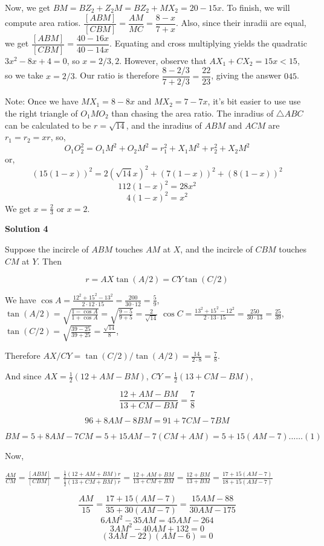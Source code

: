 \begin{enumerate}
 Now, we get $BM=BZ_{2}+Z_{2}M=BZ_{2}+MX_{2}=20-15x$. To finish, we will compute area ratios. $\dfrac{[ABM]}{[CBM]}=\dfrac{AM}{MC}=\dfrac{8-x}{7+x}$. Also, since their inradii are equal, we get $\dfrac{[ABM]}{[CBM]}=\dfrac{40-16x}{40-14x}$. Equating and cross multiplying yields the quadratic $3x^{2}-8x+4=0$, so $x=2/3,2$. However, observe that $AX_{1}+CX_{2}=15x<15$, so we take $x=2/3$. Our ratio is therefore $\dfrac{8-2/3}{7+2/3}=\dfrac{22}{23}$, giving the answer $\boxed{045}$.

 Note: Once we have $MX_1=8-8x$ and $MX_2=7-7x$, it's bit easier to use use the right triangle of $O_1MO_2$ than chasing the area ratio. The inradius of $\triangle{ABC}$ can be calculated to be $r=\sqrt{14}$, and the inradius of $ABM$ and $ACM$ are $r_1=r_2= xr$, so, 
 \[O_1O_2^2 = O_1M^2 + O_2M^2 = r_1^2+X_1M^2 + r_2^2 + X_2M^2\]or,
 \[(15(1-x))^2 = 2(\sqrt{14}x)^2 + (7(1-x))^2 + (8(1-x))^2\]
 \[112(1-x)^2 = 28x^2\]
 \[4(1-x)^2 = x^2\]We get $x=\frac{2}{3}$ or $x=2$.

 



\textbf{Solution 4}

Suppose the incircle of $ABM$ touches $AM$ at $X$, and the incircle of $CBM$ touches $CM$ at $Y$. Then

 
 \[r = AX \tan(A/2) = CY \tan(C/2)\]

 We have $\cos A = \frac{12^2+15^2-13^2}{2\cdot 12\cdot 15} = \frac{200}{30\cdot 12}=\frac{5}{9}$, $\tan(A/2) = \sqrt{\frac{1-\cos A}{1+\cos A}} = \sqrt{\frac{9-5}{9+5}} = \frac{2}{\sqrt{14}}$
$\cos C = \frac{13^2+15^2-12^2}{2\cdot 13\cdot 15} = \frac{250}{30\cdot 13} = \frac{25}{39}$, $\tan(C/2) = \sqrt{\frac{39-25}{39+25}}=\frac{\sqrt{14}}{8}$,

 Therefore $AX/CY = \tan(C/2)/\tan(A/2) = \frac{14}{2\cdot 8}= \frac{7}{8}.$

 And since $AX=\frac{1}{2}(12+AM-BM)$, $CY = \frac{1}{2}(13+CM-BM)$, 

 
 \[\frac{12+AM-BM}{13+CM-BM} = \frac{7}{8}\]

 \[96+8AM-8BM = 91 +7CM-7BM\]

 \[BM= 5 + 8AM-7CM = 5 + 15AM - 7(CM+AM) = 5+15(AM-7) \dots\dots (1)\]

 Now,

 $\frac{AM}{CM} = \frac{[ABM]}{[CBM]} = \frac{\frac{1}{2}(12+AM+BM)r}{\frac{1}{2}(13+CM+BM)r}=\frac{12+AM+BM}{13+CM+BM}= \frac{12+BM}{13+BM} = \frac{17+15(AM-7)}{18+15(AM-7)}$

 \[\frac{AM}{15} = \frac{17+15(AM-7)}{35+30(AM-7)} = \frac{15AM-88}{30AM-175}\]
 \[6AM^2 - 35AM = 45AM-264\]
 \[3AM^2 -40AM+132=0\]
 \[(3AM-22)(AM-6)=0\]


\end{enumerate}
